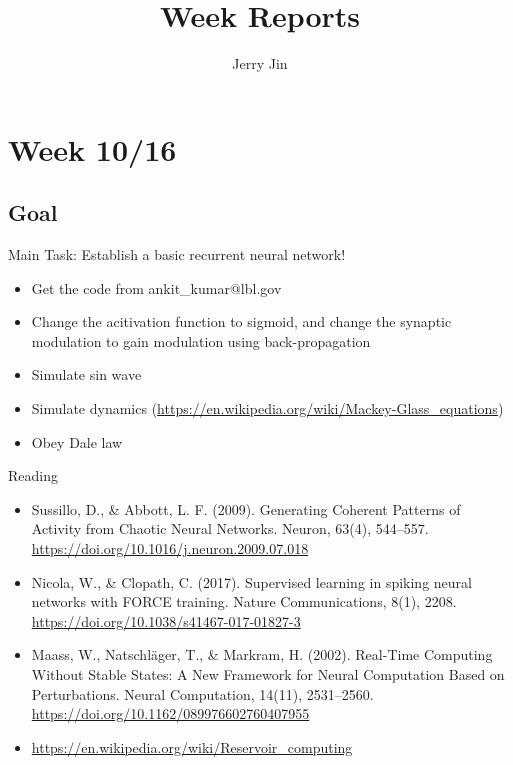 \documentclass[12pt, a4paper]{article}
\title{Week Reports}
\author{Jerry Jin}
\begin{document}
\maketitle

\section*{Week 10/16}

\subsection*{Goal}

\noindent
Main Task: Establish a basic recurrent neural network!

\begin{itemize}
    \item Get the code from ankit\_kumar@lbl.gov
    \item Change the acitivation function to sigmoid, and change the synaptic modulation to gain modulation using back-propagation
    \item Simulate sin wave
    \item Simulate dynamics (\url{https://en.wikipedia.org/wiki/Mackey-Glass_equations})
    \item Obey Dale law
\end{itemize}

\noindent
Reading

\begin{itemize}
    \item Sussillo, D., \& Abbott, L. F. (2009). Generating Coherent Patterns of Activity from Chaotic Neural Networks. Neuron, 63(4), 544–557. \url{https://doi.org/10.1016/j.neuron.2009.07.018}
    \item Nicola, W., \& Clopath, C. (2017). Supervised learning in spiking neural networks with FORCE training. Nature Communications, 8(1), 2208. \url{https://doi.org/10.1038/s41467-017-01827-3}
    \item Maass, W., Natschläger, T., \& Markram, H. (2002). Real-Time Computing Without Stable States: A New Framework for Neural Computation Based on Perturbations. Neural Computation, 14(11), 2531–2560. \url{https://doi.org/10.1162/089976602760407955}
    \item \url{https://en.wikipedia.org/wiki/Reservoir_computing}
\end{itemize}

\newpage
\end{document}
